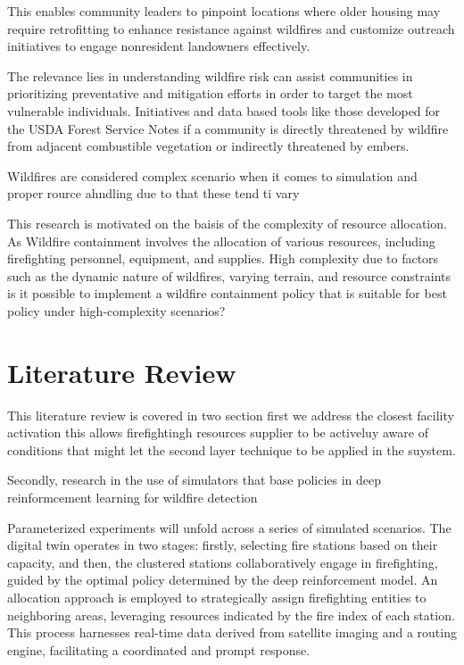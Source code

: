 \documentclass[lettersize,journal]{IEEEtran}
\begin{document}

This enables community leaders to pinpoint locations where older housing may require retrofitting to enhance resistance against wildfires and customize outreach initiatives to engage nonresident landowners effectively.




The relevance lies in understanding wildfire risk can assist communities in prioritizing preventative and mitigation efforts in order to target the most vulnerable individuals.
Initiatives and data based tools like those developed for the USDA Forest Service Notes if a community is directly threatened by wildfire from adjacent combustible vegetation or indirectly threatened by embers.


Wildfires are considered complex scenario when it comes to simulation and proper rource ahndling due to that these tend ti vary 




This research is motivated on the baisis of the complexity of resource allocation. As Wildfire containment involves the allocation of various resources, including firefighting personnel, equipment, and supplies. High complexity due to factors such as the dynamic nature of wildfires, varying terrain, and resource constraints
is it possible to implement a wildfire containment policy that is suitable for best policy under high-complexity scenarios?



\section{Literature Review}\label{Literature Review}

This literature review is covered in two section first we address the closest facility activation this allows firefightingh resources supplier to be activeluy aware of conditions that might let the second layer technique to be applied in the suystem. 




Secondly, research in the use of simulators that base policies in deep reinformcement learning for wildfire detection 



Parameterized experiments will unfold across a series of simulated scenarios. The digital twin operates in two stages: firstly, selecting fire stations based on their capacity, and then, the clustered stations collaboratively engage in firefighting, guided by the optimal policy determined by the deep reinforcement model. An allocation approach is employed to strategically assign firefighting entities to neighboring areas, leveraging resources indicated by the fire index of each station. This process harnesses real-time data derived from satellite imaging and a routing engine, facilitating a coordinated and prompt response.
\end{document}
